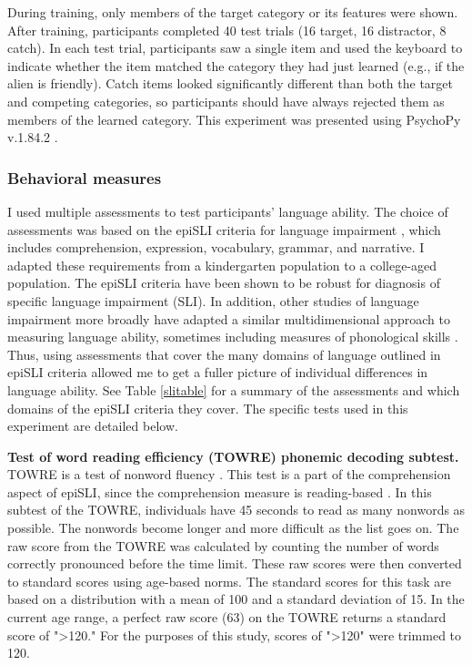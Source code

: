 \documentclass[../dissertation.tex]{subfiles}
\begin{document}
 
 During training, only members of the target category or its features were shown. After training, participants completed 40 test trials (16 target, 16 distractor, 8 catch). In each test trial, participants saw a single item and used the keyboard to indicate whether the item matched the category they had just learned (e.g., if the alien is friendly). Catch items looked significantly different than both the target and competing categories, so participants should have always rejected them as members of the learned category. This experiment was presented using PsychoPy v.1.84.2 \citep{Peirce2007}. \par
 
\subsubsection{Behavioral measures}
	I used multiple assessments to test participants' language ability.  The choice of assessments was based on the epiSLI criteria for language impairment \citep{Tomblin1996}, which includes comprehension, expression, vocabulary, grammar, and narrative. I adapted these requirements from a kindergarten population to a college-aged population. The epiSLI criteria have been shown to be robust for diagnosis of specific language impairment (SLI). In addition, other studies of language impairment more broadly have adapted a similar multidimensional approach to measuring language ability, sometimes including measures of phonological skills \citep{Catts2006}. Thus, using assessments that cover the many domains of language outlined in epiSLI criteria allowed me to get a fuller picture of individual differences in language ability. See Table \ref{slitable} for a summary of the assessments and which domains of the epiSLI criteria they cover. The specific tests used in this experiment are detailed below. \par
	\textbf{Test of word reading efficiency (TOWRE) phonemic decoding subtest.} TOWRE is a test of nonword fluency \citep{Torgesen1992}. This test is a part of the comprehension aspect of epiSLI, since the comprehension measure is reading-based \citep{Gough1986a}. In this subtest of the TOWRE, individuals have 45 seconds to read as many nonwords as possible. The nonwords become longer and more difficult as the list goes on. The raw score from the TOWRE was calculated by counting the number of words correctly pronounced before the time limit. These raw scores were then converted to standard scores using age-based norms. The standard scores for this task are based on a distribution with a mean of 100 and a standard deviation of 15. In the current age range, a perfect raw score (63) on the TOWRE returns a standard score of "\textgreater 120." For the purposes of this study, scores of "\textgreater 120" were trimmed to 120. \par
\end{document}
